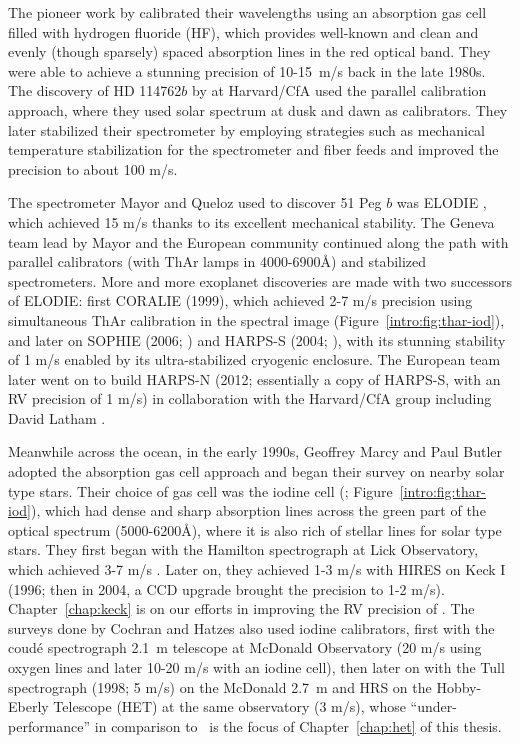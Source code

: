 The pioneer work by \cite{1988ApJ...331..902C} calibrated their
wavelengths using an absorption gas cell filled with hydrogen fluoride
(HF), which provides well-known and clean and evenly (though sparsely)
spaced absorption lines in the red optical band. They were able to
achieve a stunning precision of 10-15~m/s back in the late 1980s. The
discovery of HD 114762$b$ by \cite{1989Natur.339...38L} at Harvard/CfA
used the parallel calibration approach, where they used solar spectrum
at dusk and dawn as calibrators. They later stabilized their
spectrometer by employing strategies such as mechanical temperature
stabilization for the spectrometer and fiber feeds and improved the
precision to about 100 m/s.

The spectrometer Mayor and Queloz used to discover 51 Peg $b$ was
ELODIE \citep{elodie}, which achieved 15 m/s thanks to its excellent
mechanical stability. The Geneva team lead by Mayor and the European
community continued along the path with parallel calibrators (with
ThAr lamps in 4000-6900\AA) and stabilized spectrometers. More and
more exoplanet discoveries are made with two successors of ELODIE:
first CORALIE (1999), which achieved 2-7 m/s precision using
simultaneous ThAr calibration in the spectral image
(Figure~\ref{intro:fig:thar-iod}), and later on SOPHIE (2006;
\citealt{2008SPIE.7014E..0JP}) and HARPS-S (2004; \citealt{harps-s}),
with its stunning stability of 1 m/s enabled by its ultra-stabilized
cryogenic enclosure. The European team later went on to build HARPS-N
(2012; essentially a copy of HARPS-S, with an RV precision of 1 m/s) in
collaboration with the Harvard/CfA group including David Latham
\citep{2012SPIE.8446E..1VC}. 

Meanwhile across the ocean, in the early 1990s, Geoffrey Marcy and
Paul Butler adopted the absorption gas cell approach and began their
survey on nearby solar type stars. Their choice of gas cell was the
iodine cell (\citealt{1992PASP..104..270M};
Figure~\ref{intro:fig:thar-iod}), which had dense and sharp absorption
lines across the green part of the optical spectrum (5000-6200\AA),
where it is also rich of stellar lines for solar type stars. They
first began with the Hamilton spectrograph at Lick Observatory, which
achieved 3-7 m/s \citep{2014ApJS..210....5F}. Later on, they achieved
1-3 m/s with HIRES on Keck I (1996; then in 2004, a CCD upgrade
brought the precision to 1-2 m/s). Chapter~\ref{chap:keck} is on our
efforts in improving the RV precision of \keck. The surveys done by
Cochran and Hatzes also used iodine calibrators, first with the
coud\'e spectrograph 2.1~m telescope at McDonald Observatory (20 m/s
using oxygen lines and later 10-20 m/s with an iodine cell), then
later on with the Tull spectrograph (1998; 5 m/s) on the McDonald
2.7~m and HRS on the Hobby-Eberly Telescope (HET) at the same
observatory (3 m/s), whose ``under-performance'' in comparison to
\keck\ is the focus of Chapter~\ref{chap:het} of this thesis.

